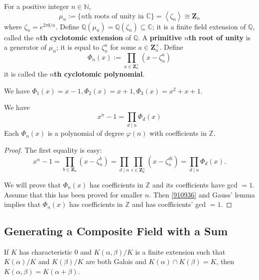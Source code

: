 \begin{definition}
For a positive integer $n \in \mathbb{N}$,
\[
\mu_n:=\{n \text {th roots of unity in } \mathbb{C}\}=\left\langle\zeta_n\right\rangle \cong \mathbf{Z}_n
\]where $\zeta_n=e^{2 \pi \mathbf{i} / n}$.
Define $\mathbb{Q}\left(\mu_n\right)=\mathbb{Q}\left(\zeta_n\right) \subseteq \mathbb{C}$; it is a finite field extension of $\mathbb{Q}$, called the \textbf{$n$th cyclotomic extension} of $\mathbb{Q}$.
A \textbf{primitive $n$th root of unity} is a generator of $\mu_n$; it is equal to $\zeta_n^a$ for some $a \in \mathbf{Z}_n^{\times}$. Define
\[
\Phi_n(x):=\prod_{a \in \mathbf{Z}_n^{\times}}\left(x-\zeta_n^a\right)
\]it is called the \textbf{$n$th cyclotomic polynomial}.
\end{definition}
\begin{example}
We have $\Phi_1(x)=x-1, \Phi_2(x)=x+1, \Phi_3(x)=x^2+x+1$.
\end{example}
\begin{lemma}
We have
\[
x^n-1=\prod_{d \mid n} \Phi_d(x)
\]Each $\Phi_n(x)$ is a polynomial of degree $\varphi(n)$ with coefficients in $\mathbb{Z}$.
\end{lemma}
\begin{proof}
The first equality is easy:
\begin{equation}
x^n-1=\prod_{b \in \mathbf{Z}_n}\left(x-\zeta_n^b\right)=\prod_{d \mid n} \prod_{i \in \mathbf{Z}_d^{\times}}\left(x-\zeta_n^{d i}\right)=\prod_{d \mid n} \Phi_d(x) .
\label{910936}
\end{equation}

We will prove that $\Phi_n(x)$ has coefficients in $\mathbb{Z}$ and its coefficients have gcd $=1$. Assume that this has been proved for smaller $n$. Then \cref{910936} and Gauss' lemma implies that $\Phi_n(x)$ has coefficients in $\mathbb{Z}$ and has coefficients' gcd $=1$.
\end{proof}

\subsection{Generating a Composite Field with a Sum}

\begin{theorem}[Theorem 7.1]
If $K$ has characteristic 0 and $K(\alpha, \beta) / K$ is a finite extension such that $K(\alpha) / K$ and $K(\beta) / K$ are both Galois and $K(\alpha) \cap K(\beta)=K$, then $K(\alpha, \beta)=K(\alpha+\beta)$.\label{561cb5}
\end{theorem}

